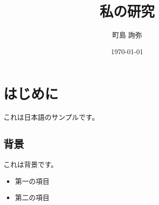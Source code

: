 \documentclass[uplatex]{bxjsarticle}
\begin{document}
\title{私の研究}
\author{町島 詢弥}
\date{\today}
\maketitle

\section{はじめに}
これは日本語のサンプルです。

\subsection{背景}
これは背景です。

\begin{itemize}
    \item 第一の項目
    \item 第二の項目
\end{itemize}
\end{document}

